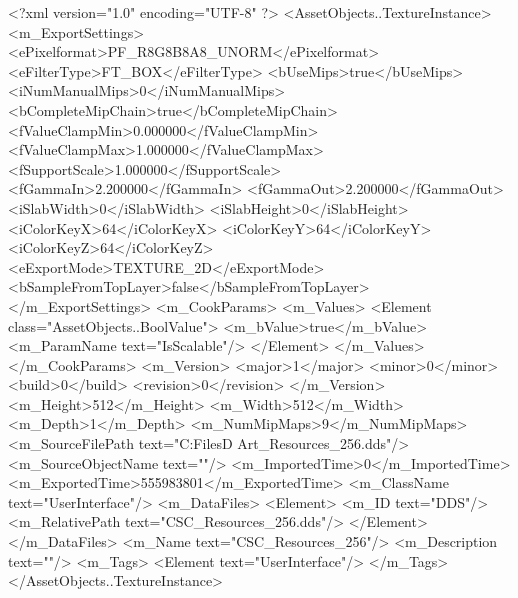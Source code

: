 <?xml version="1.0" encoding="UTF-8" ?>
<AssetObjects..TextureInstance>
	<m_ExportSettings>
		<ePixelformat>PF_R8G8B8A8_UNORM</ePixelformat>
		<eFilterType>FT_BOX</eFilterType>
		<bUseMips>true</bUseMips>
		<iNumManualMips>0</iNumManualMips>
		<bCompleteMipChain>true</bCompleteMipChain>
		<fValueClampMin>0.000000</fValueClampMin>
		<fValueClampMax>1.000000</fValueClampMax>
		<fSupportScale>1.000000</fSupportScale>
		<fGammaIn>2.200000</fGammaIn>
		<fGammaOut>2.200000</fGammaOut>
		<iSlabWidth>0</iSlabWidth>
		<iSlabHeight>0</iSlabHeight>
		<iColorKeyX>64</iColorKeyX>
		<iColorKeyY>64</iColorKeyY>
		<iColorKeyZ>64</iColorKeyZ>
		<eExportMode>TEXTURE_2D</eExportMode>
		<bSampleFromTopLayer>false</bSampleFromTopLayer>
	</m_ExportSettings>
	<m_CookParams>
		<m_Values>
			<Element class="AssetObjects..BoolValue">
				<m_bValue>true</m_bValue>
				<m_ParamName text="IsScalable"/>
			</Element>
		</m_Values>
	</m_CookParams>
	<m_Version>
		<major>1</major>
		<minor>0</minor>
		<build>0</build>
		<revision>0</revision>
	</m_Version>
	<m_Height>512</m_Height>
	<m_Width>512</m_Width>
	<m_Depth>1</m_Depth>
	<m_NumMipMaps>9</m_NumMipMaps>
	<m_SourceFilePath text="C:\Users\Shadow\Desktop\Working Files\2D Art\Resources\CSC_Resources_256.dds"/>
	<m_SourceObjectName text=""/>
	<m_ImportedTime>0</m_ImportedTime>
	<m_ExportedTime>555983801</m_ExportedTime>
	<m_ClassName text="UserInterface"/>
	<m_DataFiles>
		<Element>
			<m_ID text="DDS"/>
			<m_RelativePath text="CSC_Resources_256.dds"/>
		</Element>
	</m_DataFiles>
	<m_Name text="CSC_Resources_256"/>
	<m_Description text=""/>
	<m_Tags>
		<Element text="UserInterface"/>
	</m_Tags>
</AssetObjects..TextureInstance>
